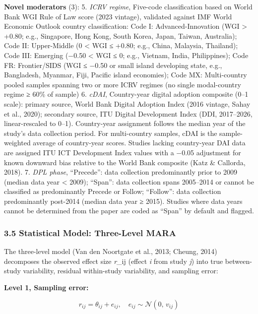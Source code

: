 \documentclass[
  12pt,a4paper]{article}
\begin{document}
\textbf{Novel moderators} (3): 5. \emph{ICRV regime}, Five-code
classification based on World Bank WGI Rule of Law score (2023 vintage),
validated against IMF World Economic Outlook country classification:
Code I: Advanced-Innovation (WGI \textgreater{} +0.80; e.g., Singapore,
Hong Kong, South Korea, Japan, Taiwan, Australia); Code II: Upper-Middle
(0 \textless{} WGI ≤ +0.80; e.g., China, Malaysia, Thailand); Code III:
Emerging (−0.50 \textless{} WGI ≤ 0; e.g., Vietnam, India, Philippines);
Code FR: Frontier/SIDS (WGI ≤ −0.50 or small island developing state,
e.g., Bangladesh, Myanmar, Fiji, Pacific island economies); Code MX:
Multi-country pooled samples spanning two or more ICRV regimes (no
single modal-country regime ≥ 60\% of sample) 6. \emph{cDAI},
Country-year digital adoption composite (0--1 scale): primary source,
World Bank Digital Adoption Index (2016 vintage, Sahay et al., 2020);
secondary source, ITU Digital Development Index (DDI, 2017--2026,
linear-rescaled to 0--1). Country-year assignment follows the median
year of the study's data collection period. For multi-country samples,
cDAI is the sample-weighted average of country-year scores. Studies
lacking country-year DAI data are assigned ITU ICT Development Index
values with a −0.05 adjustment for known downward bias relative to the
World Bank composite (Katz \& Callorda, 2018). 7. \emph{DPL phase},
``Precede'': data collection predominantly prior to 2009 (median data
year \textless{} 2009); ``Span'': data collection spans 2005--2014 or
cannot be classified as predominantly Precede or Follow; ``Follow'':
data collection predominantly post-2014 (median data year ≥ 2015).
Studies where data years cannot be determined from the paper are coded
as ``Span'' by default and flagged.

\hypertarget{statistical-model-three-level-mara}{%
\subsubsection{3.5 Statistical Model: Three-Level
MARA}\label{statistical-model-three-level-mara}}

The three-level model (Van den Noortgate et al., 2013; Cheung, 2014)
decomposes the observed effect size \emph{r}\_ij (effect \emph{i} from
study \emph{j}) into true between-study variability, residual
within-study variability, and sampling error:

\textbf{Level 1, Sampling error:}

\[r_{ij} = \theta_{ij} + e_{ij}, \quad e_{ij} \sim \mathcal{N}\left( 0, \, v_{ij} \right)\]
\end{document}
